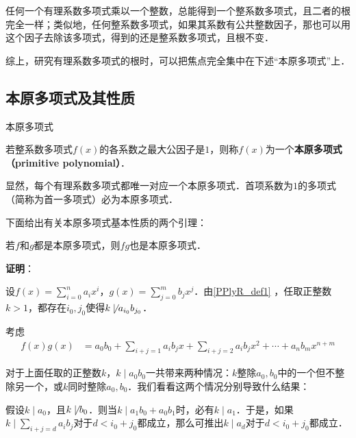 

任何一个有理系数多项式乘以一个整数，总能得到一个整系数多项式，且二者的根完全一样；类似地，任何整系数多项式，如果其系数有公共整数因子，那也可以用这个因子去除该多项式，得到的还是整系数多项式，且根不变．

综上，研究有理系数多项式的根时，可以把焦点完全集中在下述“本原多项式”上．


\subsection{本原多项式及其性质}


\begin{definition}{本原多项式}\label{PPlyR_def1}

若整系数多项式$f(x)$的各系数之最大公因子是$1$，则称$f(x)$为一个\textbf{本原多项式（primitive polynomial）}．

\end{definition}

显然，每个有理系数多项式都唯一对应一个本原多项式．首项系数为$1$的多项式（简称为首一多项式）必为本原多项式．

下面给出有关本原多项式基本性质的两个引理：

\begin{lemma}{}\label{PPlyR_lem1}
若$f$和$g$都是本原多项式，则$fg$也是本原多项式．
\end{lemma}

\textbf{证明}：

设$f(x) = \sum_{i=0}^n a_ix^i$，$g(x) = \sum_{j=0}^m b_jx^j$．由\autoref{PPlyR_def1} ，任取正整数$k>1$，都存在$i_0, j_0$使得$k\not\mid a_{i_0}b_{j_0}$．

考虑
\begin{equation}\label{PPlyR_eq1}
\begin{aligned}
f(x)g(x) &= a_0b_0 + \sum_{i+j=1}a_ib_jx + \sum_{i+j=2}a_ib_jx^2+\cdots +a_nb_mx^{n+m}
\end{aligned}
\end{equation}

对于上面任取的正整数$k$，$k\mid a_0b_0$一共带来两种情况：$k$整除$a_0, b_0$中的一个但不整除另一个，或$k$同时整除$a_0, b_0$．我们看看这两个情况分别导致什么结果：

假设$k\mid a_0$，且$k\not\mid b_0$．则当$k\mid a_1b_0+a_0b_1$时，必有$k\mid a_1$．于是，如果$k\mid\sum_{i+j=d}a_ib_j$对于$d<i_0+j_0$都成立，那么可推出$k\mid a_d$对于$d<i_0+j_0$都成立．

